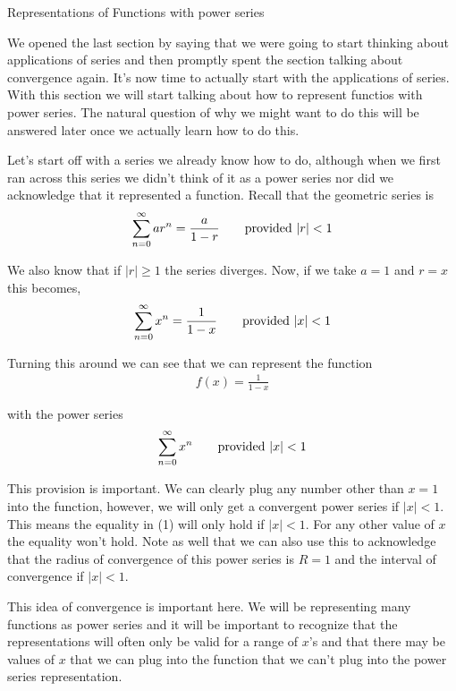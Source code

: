 \documentclass[10pt]{article}
\begin{document}

Representations of Functions with power series


We opened the last section by saying that we were going to start thinking about applications of series and then promptly spent the section talking about convergence again.  It's now time to actually start with the applications of series. With this section  we will start talking about how to represent functios with power series.  The natural question of why we might want to do this will be answered later once we actually learn how to do this.  

Let's start off with a series we already know how to do, although when we first ran across this series we didn't think of it as a power series nor did we acknowledge that it represented a function. Recall that the geometric series is
$$\sum\limits_{n=0}^{\infty}ar^n = \frac{a}{1-r} \qquad {\rm provided} \ |r|<1$$

We also know that if $|r|\geq 1$ the series diverges. Now, if we take $a=1$ and $r=x$ this becomes,
\begin{align}
\sum\limits_{n=0}^{\infty}x^n = \frac{1}{1-x} \qquad {\rm provided} \ |x|<1
\end{align}

Turning this around we can see that we can represent the function
\begin{align}
f(x) = \frac{1}{1-x}
\end{align}

with the power series
\begin{align}
\sum\limits_{n=0}^{\infty}x^n \qquad {\rm provided} \ |x|<1
\end{align}

This provision is important.  We can clearly plug any number other than $x=1$ into the function, however, we will only get a convergent power series if $|x|<1$.  This means the equality in (1) will only hold if $|x|<1$.  For any other value of $x$ the equality won't hold.  Note as well that we can also use this to acknowledge that the radius of convergence of this power series is $R=1$ and the interval of convergence if $|x|<1$.

This idea of convergence is important here.  We will be representing many functions as power series and it will be important to recognize that the representations will often only be valid for a range of $x$'s and that there may be values of $x$ that we can plug into the function that we can't plug into the power series representation.
\end{document}
